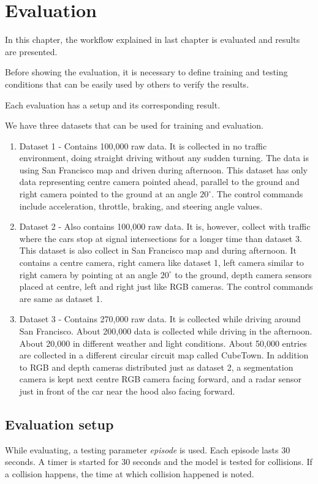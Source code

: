 \chapter{Evaluation}
In this chapter, the workflow explained in last chapter is evaluated and results are
presented.

Before showing the evaluation, it is necessary to define training and testing conditions
that can be easily used by others to verify the results.

Each evaluation has a setup and its corresponding result.

We have three datasets that can be used for training and evaluation.
\begin{enumerate}
    \item Dataset 1 - Contains 100,000 raw data. It is collected in no traffic
        environment, doing straight driving without any sudden turning. The data is using
        San Francisco map and driven during afternoon. This dataset has only data
        representing centre camera pointed ahead, parallel to the ground and right camera
        pointed to the ground at an angle $20^{\circ}$. The control commands include
        acceleration, throttle, braking, and steering angle values.
    \item Dataset 2 - Also contains 100,000 raw data. It is, however, collect with traffic
        where the cars stop at signal intersections for a longer time than dataset 3. This
        dataset is also collect in San Francisco map and during afternoon. It contains a
        centre camera, right camera like dataset 1, left camera similar to right camera by
        pointing at an angle $20^{\circ}$ to the ground, depth camera sensors placed at
        centre, left and right just like RGB cameras. The control commands are same as
        dataset 1.
    \item Dataset 3 - Contains 270,000 raw data. It is collected while driving around San
        Francisco. About 200,000 data is collected while driving in the afternoon. About
        20,000 in different weather and light conditions. About 50,000 entries are
        collected in a different circular circuit map called CubeTown. In addition to RGB
        and depth cameras distributed just as dataset 2, a segmentation camera is kept
        next centre RGB camera facing forward, and a radar sensor just in front of the
        car near the hood also facing forward.

\end{enumerate}
\section{Evaluation setup}
While evaluating, a testing parameter \textit{episode} is used. Each episode lasts 30 seconds. A timer is started for 30 seconds and
the  model is tested for collisions. If a collision happens, the time at which collision
happened is noted.

